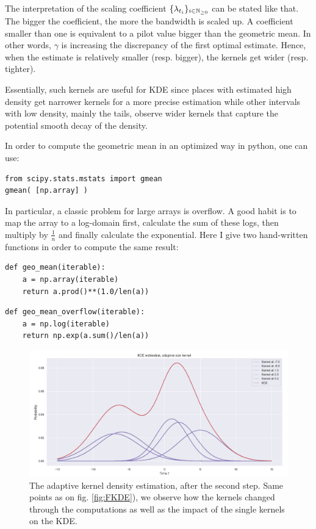 \begin{remarque}
The interpretation of the scaling coefficient $\{ \lambda_{t_i} \}_{ i \in \mathbb{N}_{\geq 0}}$ can be stated like that. The bigger the coefficient, the more the bandwidth is scaled up. A coefficient smaller than one is equivalent to a pilot value bigger than the geometric mean. In other words, $\gamma$ is increasing the discrepancy of the first optimal estimate. Hence, when the estimate is relatively smaller (resp. bigger), the kernels get wider (resp. tighter). 

Essentially, such kernels are useful for KDE since places with estimated high density get narrower kernels for a more precise estimation while other intervals with low density, mainly the tails, observe wider kernels that capture the potential smooth decay of the density. 
\end{remarque}



In order to compute the geometric mean in an optimized way in python, one can use:

\begin{verbatim}
from scipy.stats.mstats import gmean
gmean( [np.array] )
\end{verbatim}

In particular, a classic problem for large arrays is overflow. A good habit is to map the array to a log-domain first, calculate the sum of these logs, then multiply by $\frac 1 n$ and finally calculate the exponential. Here I give two hand-written functions in order to compute the same result:

\begin{verbatim}
def geo_mean(iterable):
    a = np.array(iterable)
    return a.prod()**(1.0/len(a))
\end{verbatim}    
\begin{verbatim}
def geo_mean_overflow(iterable):
    a = np.log(iterable)
    return np.exp(a.sum()/len(a))
\end{verbatim}



\begin{figure}
\centering
\includegraphics[width = 0.90 \textwidth]{../imag/chap3/AKDE.png}
\caption{The adaptive kernel density estimation, after the second step. Same points as on fig. \ref{fig:FKDE}), we observe how the kernels changed through the computations as well as the impact of the single kernels on the KDE.}
\end{figure}








